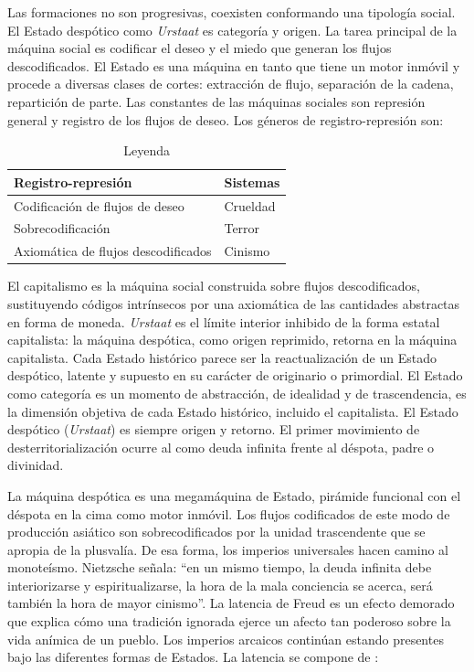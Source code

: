 Las formaciones no son progresivas, coexisten conformando una tipología social. El Estado despótico como \emph{Urstaat} es categoría y origen. La tarea principal de la máquina social es codificar el deseo y el miedo que generan los flujos descodificados. El Estado es una máquina en tanto que tiene un motor inmóvil y procede a diversas clases de cortes: extracción de flujo, separación de la cadena, repartición de parte. Las constantes de las máquinas sociales son represión general y registro de los flujos de deseo. Los géneros de registro-represión son:

\begin{table}[htb]
  \caption{Leyenda} %
  \label{tab:tablename}
  \centering
  \begin{tabular}{ll}
    \toprule
    \textbf{Registro-represión} & \textbf{Sistemas}\\
    \midrule
    Codificación de flujos de deseo & Crueldad\\
    Sobrecodificación & Terror\\
    Axiomática de flujos descodificados & Cinismo\\
\bottomrule
  \end{tabular}
\end{table}

El capitalismo es la máquina social construida sobre flujos descodificados, sustituyendo códigos intrínsecos por una axiomática de las cantidades abstractas en forma de moneda. \emph{Urstaat} es el límite interior inhibido de la forma estatal capitalista: la máquina despótica, como origen reprimido, retorna en la máquina capitalista. Cada Estado histórico parece ser la reactualización de un Estado despótico, latente y supuesto en su carácter de originario o primordial. El Estado como categoría es un momento de abstracción, de idealidad y de trascendencia, es la dimensión objetiva de cada Estado histórico, incluido el capitalista. El Estado despótico (\emph{Urstaat}) es siempre origen y retorno. El primer movimiento de desterritorialización ocurre al  como deuda infinita frente al déspota, padre o divinidad.

La máquina despótica es una megamáquina de Estado, pirámide funcional con el déspota en la cima como motor inmóvil. Los flujos codificados de este modo de producción asiático son sobrecodificados por la unidad trascendente que se apropia de la plusvalía. De esa forma, los imperios universales hacen camino al monoteísmo. Nietzsche señala: \enquote{en un mismo tiempo, la deuda infinita debe interiorizarse y espiritualizarse, la hora de la mala conciencia se acerca, será también la hora de mayor cinismo}. La latencia de Freud es un efecto demorado que explica cómo una tradición ignorada ejerce un afecto tan poderoso sobre la vida anímica de un pueblo. Los imperios arcaicos continúan estando presentes bajo las diferentes formas de Estados. La latencia se compone de \autocite{deleuzeAntiedipoCapitalismoEsquizofrenia2017}:

